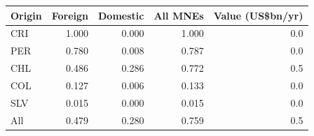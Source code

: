 \begin{tabular}{lrrrr}
\toprule
Origin & Foreign & Domestic & All MNEs & Value (US\$bn/yr) \\
\midrule
CRI & 1.000 & 0.000 & 1.000 & 0.0 \\
PER & 0.780 & 0.008 & 0.787 & 0.0 \\
CHL & 0.486 & 0.286 & 0.772 & 0.5 \\
COL & 0.127 & 0.006 & 0.133 & 0.0 \\
SLV & 0.015 & 0.000 & 0.015 & 0.0 \\
\midrule
All & 0.479 & 0.280 & 0.759 & 0.5 \\
\bottomrule
\end{tabular}
